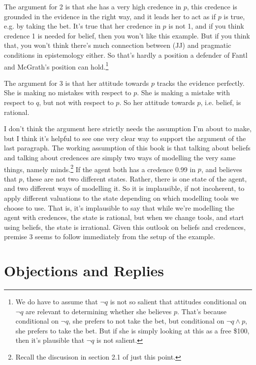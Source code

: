 The argument for 2 is that she has a very high credence in \(p\), this credence is grounded in the evidence in the right way, and it leads her to act as if \(p\) is true, e.g. by taking the bet. It's true that her credence in \(p\) is not 1, and if you think credence 1 is needed for belief, then you won't like this example. But if you think that, you won't think there's much connection between (JJ) and pragmatic conditions in epistemology either. So that's hardly a position a defender of Fantl and McGrath's position can hold.\footnote{We do have to assume that \(\neg q\) is not so salient that attitudes conditional on \(\neg q\) are relevant to determining whether she believes \(p\). That's because conditional on \(\neg q\), she prefers to not take the bet, but conditional on \(\neg q \wedge p\), she prefers to take the bet. But if she is simply looking at this as a free \$100, then it's plausible that \(\neg q\) is not salient.}

The argument for 3 is that her attitude towards \(p\) tracks the evidence perfectly. She is making no mistakes with respect to \(p\). She is making a mistake with respect to \(q\), but not with respect to \(p\). So her attitude towards \(p\), i.e. belief, is rational.

I don't think the argument here strictly needs the assumption I'm about to make, but I think it's helpful to see one very clear way to support the argument of the last paragraph. The working assumption of this book is that talking about beliefs and talking about credences are simply two ways of modelling the very same things, namely minds.\footnote{Recall the discusison in section 2.1 of just this point.} If the agent both has a credence 0.99 in \(p\), and believes that \(p\), these are not two different states. Rather, there is one state of the agent, and two different ways of modelling it. So it is implausible, if not incoherent, to apply different valuations to the state depending on which modelling tools we choose to use. That is, it's implausible to say that while we're modelling the agent with credences, the state is rational, but when we change tools, and start using beliefs, the state is irrational. Given this outlook on beliefs and credences, premise 3 seems to follow immediately from the setup of the example.

\section{Objections and Replies}

